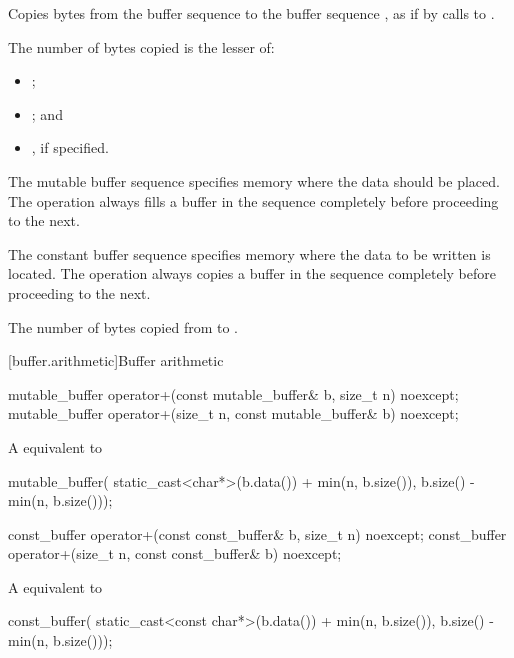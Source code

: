 \begin{itemdescr}
\pnum
\effects Copies bytes from the buffer sequence  to the buffer sequence , as if by calls to .

\pnum
The number of bytes copied is the lesser of:
\begin{itemize}
\item
{};
\item
{}; and
\item
{}, if specified.
\end{itemize}

\pnum
The mutable buffer sequence  specifies memory where the data should be placed. The operation always fills a buffer in the sequence completely before proceeding to the next.

\pnum
The constant buffer sequence  specifies memory where the data to be written is located. The operation always copies a buffer in the sequence completely before proceeding to the next.

\pnum
\returns The number of bytes copied from  to .
\end{itemdescr}



[buffer.arithmetic]{Buffer arithmetic}

\begin{itemdecl}
mutable_buffer operator+(const mutable_buffer& b, size_t n) noexcept;
mutable_buffer operator+(size_t n, const mutable_buffer& b) noexcept;
\end{itemdecl}

\begin{itemdescr}
\pnum
\returns A  equivalent to
\begin{codeblock}
mutable_buffer(
  static_cast<char*>(b.data()) + min(n, b.size()),
  b.size() - min(n, b.size()));
\end{codeblock}

\end{itemdescr}

\begin{itemdecl}
const_buffer operator+(const const_buffer& b, size_t n) noexcept;
const_buffer operator+(size_t n, const const_buffer& b) noexcept;
\end{itemdecl}

\begin{itemdescr}
\pnum
\returns A  equivalent to
\begin{codeblock}
const_buffer(
  static_cast<const char*>(b.data()) + min(n, b.size()),
  b.size() - min(n, b.size()));
\end{codeblock}

\end{itemdescr}



